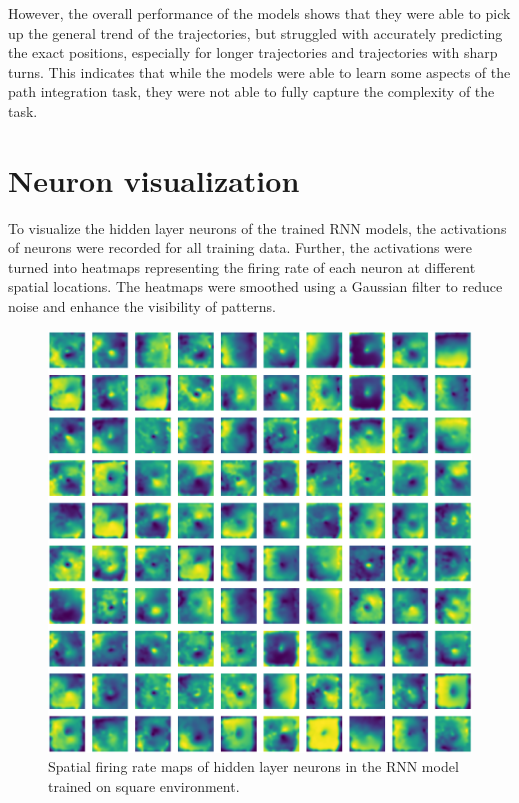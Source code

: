 \documentclass{article}
\begin{document}
However, the overall performance of the models shows that they were able to pick up the general trend of the trajectories, but struggled with accurately predicting the exact positions, especially for longer trajectories and trajectories with sharp turns. This indicates that while the models were able to learn some aspects of the path integration task, they were not able to fully capture the complexity of the task.


\section{Neuron visualization}
To visualize the hidden layer neurons of the trained RNN models, the activations of neurons were recorded for all training data. Further, the activations were turned into heatmaps representing the firing rate of each neuron at different spatial locations. The heatmaps were smoothed using a Gaussian filter to reduce noise and enhance the visibility of patterns. 

\begin{figure}
  \centering
  \includegraphics[width=\textwidth]{figures/rnn_square_neuron_spatial_maps.png}
  \caption{Spatial firing rate maps of hidden layer neurons in the RNN model trained on square environment.}
  \label{fig:square_neuron_maps}
\end{figure}
\end{document}

